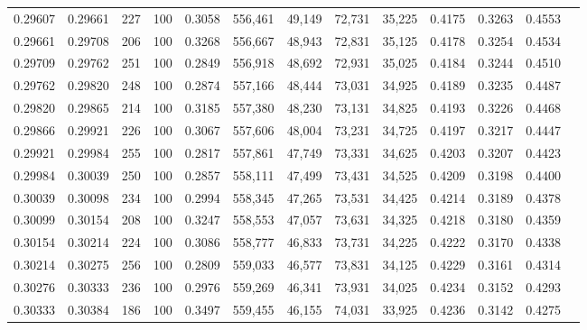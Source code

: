 \begin{tabular}{rrrrrrrrrrrrr}
0.29607 & 0.29661 &   227 & 100 &                                     0.3058 & 556,461 &  49,149 &  72,731 &  35,225 & 0.4175 & 0.3263 & 0.4553 \\
0.29661 & 0.29708 &   206 & 100 &                                     0.3268 & 556,667 &  48,943 &  72,831 &  35,125 & 0.4178 & 0.3254 & 0.4534 \\
0.29709 & 0.29762 &   251 & 100 &                                     0.2849 & 556,918 &  48,692 &  72,931 &  35,025 & 0.4184 & 0.3244 & 0.4510 \\
0.29762 & 0.29820 &   248 & 100 &                                     0.2874 & 557,166 &  48,444 &  73,031 &  34,925 & 0.4189 & 0.3235 & 0.4487 \\
0.29820 & 0.29865 &   214 & 100 &                                     0.3185 & 557,380 &  48,230 &  73,131 &  34,825 & 0.4193 & 0.3226 & 0.4468 \\
0.29866 & 0.29921 &   226 & 100 &                                     0.3067 & 557,606 &  48,004 &  73,231 &  34,725 & 0.4197 & 0.3217 & 0.4447 \\
0.29921 & 0.29984 &   255 & 100 &                                     0.2817 & 557,861 &  47,749 &  73,331 &  34,625 & 0.4203 & 0.3207 & 0.4423 \\
0.29984 & 0.30039 &   250 & 100 &                                     0.2857 & 558,111 &  47,499 &  73,431 &  34,525 & 0.4209 & 0.3198 & 0.4400 \\
0.30039 & 0.30098 &   234 & 100 &                                     0.2994 & 558,345 &  47,265 &  73,531 &  34,425 & 0.4214 & 0.3189 & 0.4378 \\
0.30099 & 0.30154 &   208 & 100 &                                     0.3247 & 558,553 &  47,057 &  73,631 &  34,325 & 0.4218 & 0.3180 & 0.4359 \\
0.30154 & 0.30214 &   224 & 100 &                                     0.3086 & 558,777 &  46,833 &  73,731 &  34,225 & 0.4222 & 0.3170 & 0.4338 \\
0.30214 & 0.30275 &   256 & 100 &                                     0.2809 & 559,033 &  46,577 &  73,831 &  34,125 & 0.4229 & 0.3161 & 0.4314 \\
0.30276 & 0.30333 &   236 & 100 &                                     0.2976 & 559,269 &  46,341 &  73,931 &  34,025 & 0.4234 & 0.3152 & 0.4293 \\
0.30333 & 0.30384 &   186 & 100 &                                     0.3497 & 559,455 &  46,155 &  74,031 &  33,925 & 0.4236 & 0.3142 & 0.4275 \\

\end{tabular}
